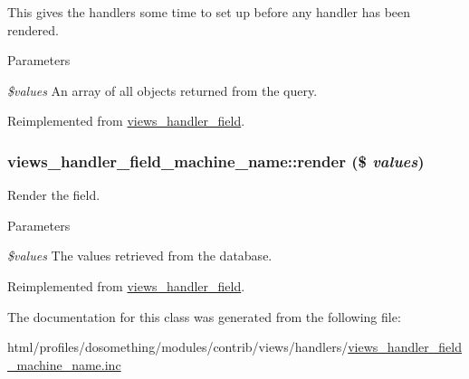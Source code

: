 This gives the handlers some time to set up before any handler has been rendered.


\begin{DoxyParams}{Parameters}
\item[{\em \$values}]An array of all objects returned from the query. \end{DoxyParams}


Reimplemented from \hyperlink{classviews__handler__field_aff134f525e1f83271183939fda4cd0e8}{views\_\-handler\_\-field}.\hypertarget{classviews__handler__field__machine__name_aa825279a03869f72671e453f5f75dfde}{
\subsubsection[{render}]{\setlength{\rightskip}{0pt plus 5cm}views\_\-handler\_\-field\_\-machine\_\-name::render (\$ {\em values})}}
\label{classviews__handler__field__machine__name_aa825279a03869f72671e453f5f75dfde}
Render the field.


\begin{DoxyParams}{Parameters}
\item[{\em \$values}]The values retrieved from the database. \end{DoxyParams}


Reimplemented from \hyperlink{classviews__handler__field_a82ff951c5e9ceb97b2eab86f880cbc1e}{views\_\-handler\_\-field}.

The documentation for this class was generated from the following file:\begin{DoxyCompactItemize}
\item 
html/profiles/dosomething/modules/contrib/views/handlers/\hyperlink{views__handler__field__machine__name_8inc}{views\_\-handler\_\-field\_\-machine\_\-name.inc}\end{DoxyCompactItemize}
